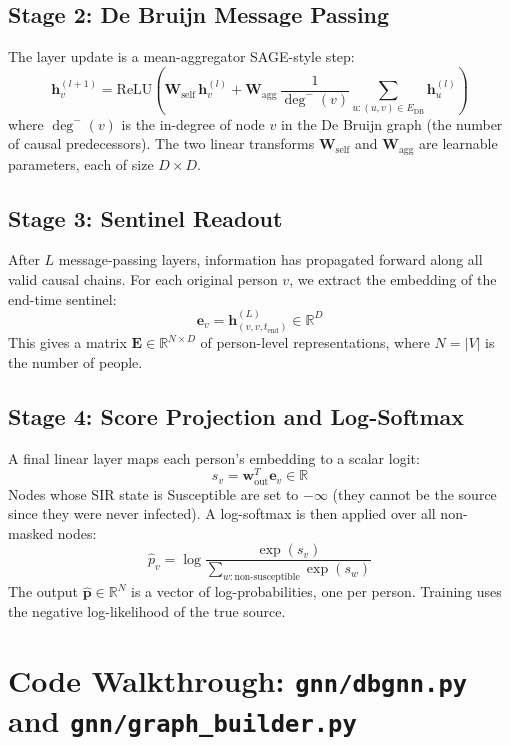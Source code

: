 \subsection{Stage 2: De Bruijn Message Passing}

The layer update is a mean-aggregator SAGE-style step:
\[
    \mathbf{h}_{v}^{(l+1)} = \text{ReLU}\!\left(
        \mathbf{W}_{\text{self}}\, \mathbf{h}_{v}^{(l)}
        + \mathbf{W}_{\text{agg}}\, \frac{1}{\deg^{-}(v)} \sum_{u: (u,v) \in E_{\text{DB}}}
          \mathbf{h}_{u}^{(l)}
    \right)
\]
where $\deg^{-}(v)$ is the in-degree of node $v$ in the De Bruijn graph (the number of causal
predecessors). The two linear transforms $\mathbf{W}_{\text{self}}$ and $\mathbf{W}_{\text{agg}}$
are learnable parameters, each of size $D \times D$.

\subsection{Stage 3: Sentinel Readout}

After $L$ message-passing layers, information has propagated forward along all valid causal chains.
For each original person $v$, we extract the embedding of the end-time sentinel:
\[
    \mathbf{e}_v = \mathbf{h}_{(v,v,t_{\text{end}})}^{(L)} \in \mathbb{R}^D
\]
This gives a matrix $\mathbf{E} \in \mathbb{R}^{N \times D}$ of person-level representations,
where $N = |V|$ is the number of people.

\subsection{Stage 4: Score Projection and Log-Softmax}

A final linear layer maps each person's embedding to a scalar logit:
\[
    s_v = \mathbf{w}_{\text{out}}^T \mathbf{e}_v \in \mathbb{R}
\]
Nodes whose SIR state is Susceptible are set to $-\infty$ (they cannot be the source since they
were never infected). A log-softmax is then applied over all non-masked nodes:
\[
    \hat{p}_v = \log\frac{\exp(s_v)}{\sum_{w: \text{non-susceptible}} \exp(s_w)}
\]
The output $\hat{\mathbf{p}} \in \mathbb{R}^N$ is a vector of log-probabilities, one per person.
Training uses the negative log-likelihood of the true source.

\section{Code Walkthrough: \texttt{gnn/dbgnn.py} and \texttt{gnn/graph\_builder.py}}

